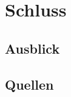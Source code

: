 \documentclass[18pt]{beamer}
\begin{document}
\section{Schluss}
\subsection{Ausblick}

\subsection{Quellen}
\begin{frame}{~}
		
		
\end{frame}
\end{document}
